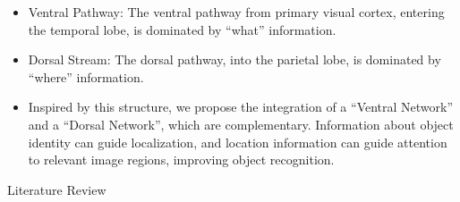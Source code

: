 \documentclass[landscape,paperwidth=76.0in,paperheight=36.0in,fontscale=0.292]{baposter}
\begin{document}
\begin{poster}
{    \begin{itemize}
        \item Ventral Pathway:  The ventral pathway from primary visual cortex, entering the temporal lobe, is dominated by ``what'' information.
        \item Dorsal Stream: The dorsal pathway, into the parietal lobe, is dominated by ``where'' information.
        \item Inspired by this structure, we propose the integration of
a ``Ventral Network'' and a ``Dorsal Network'', which are
complementary. Information about object identity can guide 
localization, and location information can guide attention to relevant
image regions, improving object recognition.
    \end{itemize}  
}

                                                 Literature Review



\end{poster}
\end{document}
